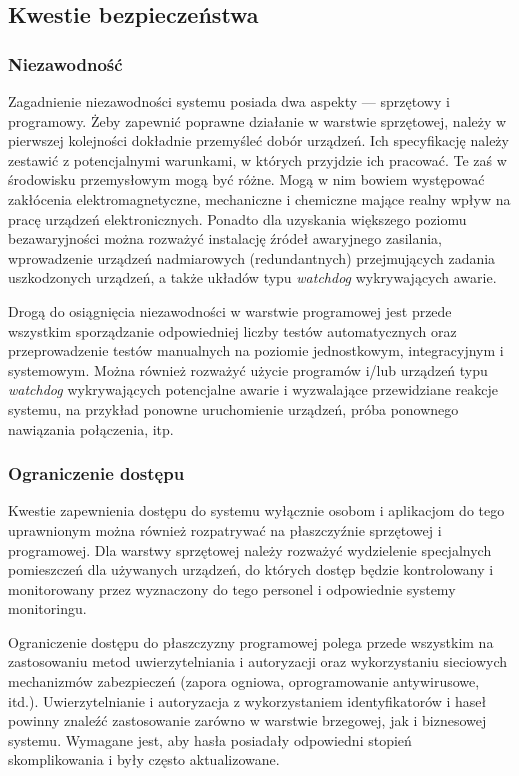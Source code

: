 \documentclass[a4paper, 12pt, twoside]{article}
\begin{document}
\subsection{Kwestie bezpieczeństwa}

\subsubsection{Niezawodność}

Zagadnienie niezawodności systemu posiada dwa aspekty --- sprzętowy i programowy.
Żeby zapewnić poprawne działanie w warstwie sprzętowej, należy w pierwszej
kolejności dokładnie przemyśleć dobór urządzeń. Ich specyfikację należy zestawić
z potencjalnymi warunkami, w których przyjdzie ich pracować. Te zaś w środowisku
przemysłowym mogą być różne. Mogą w nim bowiem występować zakłócenia elektromagnetyczne,
mechaniczne i chemiczne mające realny wpływ na pracę urządzeń elektronicznych.
Ponadto dla uzyskania większego poziomu bezawaryjności można rozważyć
instalację źródeł awaryjnego zasilania, wprowadzenie urządzeń nadmiarowych (redundantnych)
przejmujących zadania uszkodzonych urządzeń, a także układów typu \emph{watchdog}
wykrywających awarie.

Drogą do osiągnięcia niezawodności w warstwie programowej jest przede wszystkim sporządzanie
odpowiedniej liczby testów automatycznych oraz przeprowadzenie testów manualnych
na poziomie jednostkowym, integracyjnym i systemowym.
Można również rozważyć użycie programów i/lub urządzeń typu \emph{watchdog}
wykrywających potencjalne awarie i wyzwalające przewidziane reakcje systemu,
na przykład ponowne uruchomienie urządzeń, próba ponownego nawiązania połączenia, itp.

\subsubsection{Ograniczenie dostępu}

Kwestie zapewnienia dostępu do systemu wyłącznie osobom i aplikacjom do tego
uprawnionym można również rozpatrywać na płaszczyźnie sprzętowej i programowej.
Dla warstwy sprzętowej należy rozważyć wydzielenie specjalnych pomieszczeń
dla używanych urządzeń, do których dostęp będzie kontrolowany i monitorowany
przez wyznaczony do tego personel i odpowiednie systemy monitoringu.

Ograniczenie dostępu do płaszczyzny programowej polega przede wszystkim na zastosowaniu
metod uwierzytelniania i autoryzacji oraz wykorzystaniu sieciowych mechanizmów zabezpieczeń
(zapora ogniowa, oprogramowanie antywirusowe, itd.). Uwierzytelnianie i autoryzacja z wykorzystaniem
identyfikatorów i haseł powinny znaleźć zastosowanie zarówno w warstwie brzegowej,
jak i biznesowej systemu. Wymagane jest, aby hasła posiadały odpowiedni stopień skomplikowania
i były często aktualizowane.
\end{document}
